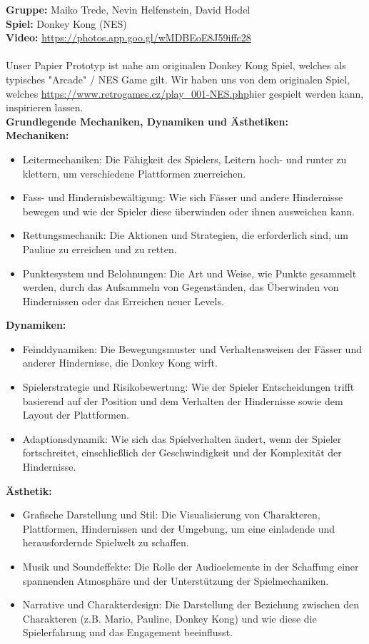 \documentclass{article}
\begin{document}
\textbf{Gruppe:} Maiko Trede, Nevin Helfenstein, David Hodel
\\
\textbf{Spiel:} Donkey Kong (NES)
\\
\textbf{Video:} \url{https://photos.app.goo.gl/wMDBEoE8J59iffc28}
\\ \\
Unser Papier Prototyp ist nahe am originalen Donkey Kong Spiel, welches als typisches "Arcade" / NES Game gilt.
Wir haben uns von dem originalen Spiel, welches \url{https://www.retrogames.cz/play_001-NES.php}{hier} gespielt werden kann,
inspirieren lassen.
\\
\textbf{Grundlegende Mechaniken, Dynamiken und Ästhetiken:}
\\
\textbf{Mechaniken:}
\begin{itemize}
    \item Leitermechaniken: Die Fähigkeit des Spielers, Leitern hoch- und runter zu klettern, um verschiedene Plattformen zuerreichen.
    \item Fass- und Hindernisbewältigung: Wie sich Fässer und andere Hindernisse bewegen und wie der Spieler diese überwinden
    oder ihnen ausweichen kann.
    \item Rettungsmechanik: Die Aktionen und Strategien, die erforderlich sind, um Pauline zu erreichen und zu retten.
    \item Punktesystem und Belohnungen: Die Art und Weise, wie Punkte gesammelt werden, durch das Aufsammeln von Gegenständen,
    das Überwinden von Hindernissen oder das Erreichen neuer Levels.
\end{itemize}
\bigskip
\textbf{Dynamiken:}
\begin{itemize}
    \item Feinddynamiken: Die Bewegungsmuster und Verhaltensweisen der Fässer und anderer Hindernisse, die Donkey Kong wirft.
    \item Spielerstrategie und Risikobewertung: Wie der Spieler Entscheidungen trifft basierend auf der Position und dem Verhalten
    der Hindernisse sowie dem Layout der Plattformen.
    \item Adaptionsdynamik: Wie sich das Spielverhalten ändert, wenn der Spieler fortschreitet, einschließlich der Geschwindigkeit
    und der Komplexität der Hindernisse.
\end{itemize}
\bigskip
\textbf{Ästhetik:}
\begin{itemize}
    \item Grafische Darstellung und Stil: Die Visualisierung von Charakteren, Plattformen, Hindernissen und der Umgebung, um eine
    einladende und herausfordernde Spielwelt zu schaffen.
    \item Musik und Soundeffekte: Die Rolle der Audioelemente in der Schaffung einer spannenden Atmosphäre und der Unterstützung
    der Spielmechaniken.
    \item Narrative und Charakterdesign: Die Darstellung der Beziehung zwischen den Charakteren (z.B. Mario, Pauline, Donkey Kong)
    und wie diese die Spielerfahrung und das Engagement beeinflusst.
\end{itemize}
\end{document}
